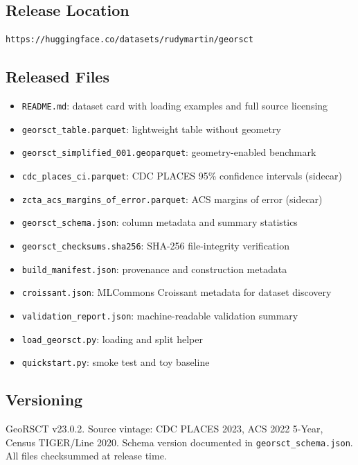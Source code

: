 \documentclass{article}
\begin{document}
\subsection{Release Location}

\begin{verbatim}
https://huggingface.co/datasets/rudymartin/georsct
\end{verbatim}

\subsection{Released Files}

\begin{itemize}
\item \texttt{README.md}: dataset card with loading examples and full source licensing
\item \texttt{georsct\_table.parquet}: lightweight table without geometry
\item \texttt{georsct\_simplified\_001.geoparquet}: geometry-enabled benchmark
\item \texttt{cdc\_places\_ci.parquet}: CDC PLACES 95\% confidence intervals (sidecar)
\item \texttt{zcta\_acs\_margins\_of\_error.parquet}: ACS margins of error (sidecar)
\item \texttt{georsct\_schema.json}: column metadata and summary statistics
\item \texttt{georsct\_checksums.sha256}: SHA-256 file-integrity verification
\item \texttt{build\_manifest.json}: provenance and construction metadata
\item \texttt{croissant.json}: MLCommons Croissant metadata for dataset discovery
\item \texttt{validation\_report.json}: machine-readable validation summary
\item \texttt{load\_georsct.py}: loading and split helper
\item \texttt{quickstart.py}: smoke test and toy baseline
\end{itemize}

\subsection{Versioning}

GeoRSCT v23.0.2. Source vintage: CDC PLACES 2023, ACS 2022 5-Year, Census TIGER/Line 2020. Schema version documented in \texttt{georsct\_schema.json}. All files checksummed at release time.
\end{document}
